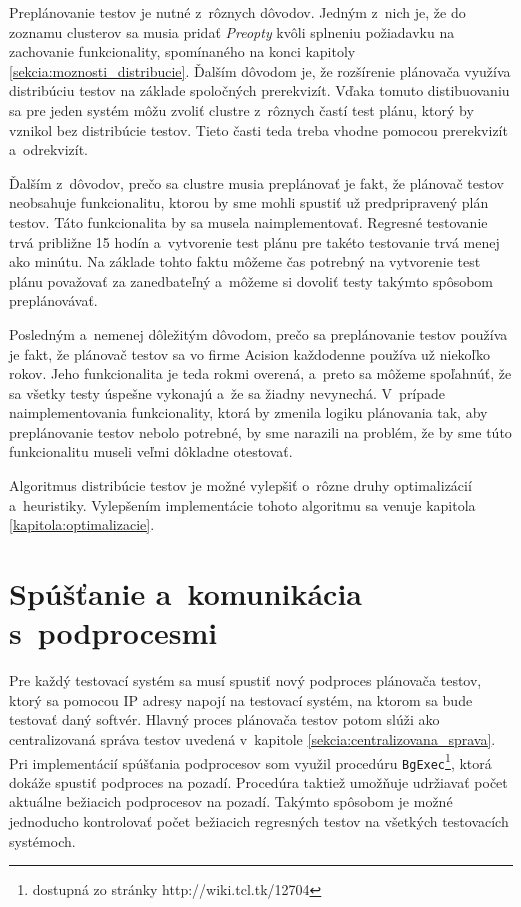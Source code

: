 Preplánovanie testov je nutné z~rôznych dôvodov. Jedným z~nich je, 
že do zoznamu clusterov sa musia pridať \textit{Preopty} kvôli splneniu 
požiadavku na zachovanie funkcionality, spomínaného na konci kapitoly 
\ref{sekcia:moznosti_distribucie}. 
Ďalším dôvodom je, že rozšírenie plánovača využíva distribúciu testov 
na základe spoločných prerekvizít. 
Vďaka tomuto distibuovaniu sa pre jeden systém môžu zvoliť clustre 
z~rôznych častí test plánu, ktorý by vznikol bez distribúcie testov.
Tieto časti teda treba vhodne  pomocou prerekvizít 
a~odrekvizít. 

Ďalším z~dôvodov, prečo sa clustre musia preplánovať je fakt, že 
plánovač testov neobsahuje funkcionalitu, ktorou by sme mohli spustiť 
už predpripravený plán testov. Táto funkcionalita by sa musela 
naimplementovať. Regresné testovanie trvá približne 15 hodín 
a~vytvorenie test plánu pre takéto testovanie trvá menej ako minútu.
Na základe tohto faktu môžeme čas potrebný na vytvorenie test plánu 
považovať za zanedbateľný a~môžeme si dovoliť testy takýmto spôsobom 
preplánovávať.

Posledným a~nemenej dôležitým dôvodom, prečo sa preplánovanie testov 
používa je fakt, že plánovač testov sa vo firme Acision každodenne 
používa už niekoľko rokov.
Jeho funkcionalita je teda rokmi overená, a~preto sa môžeme spoľahnúť, 
že sa všetky testy úspešne vykonajú a~že sa žiadny nevynechá.
V~prípade naimplementovania funkcionality, ktorá by zmenila logiku 
plánovania tak, aby preplánovanie testov nebolo potrebné, by sme narazili 
na problém, že by sme túto funkcionalitu museli veľmi dôkladne otestovať. 

Algoritmus distribúcie testov je možné vylepšiť o~rôzne druhy 
optimalizácií a~heuristiky. Vylepšením implementácie tohoto algoritmu 
sa venuje kapitola \ref{kapitola:optimalizacie}. 


\section{Spúšťanie a~komunikácia s~podprocesmi}
\label{sekcia:spustanie_podprocesov}
Pre každý testovací systém sa musí spustiť nový podproces plánovača 
testov, ktorý sa pomocou IP adresy napojí na testovací systém, 
na ktorom sa bude testovať daný softvér. Hlavný proces plánovača testov 
potom slúži ako centralizovaná správa testov uvedená
v~kapitole \ref{sekcia:centralizovana_sprava}.
Pri implementácií spúšťania podprocesov som využil procedúru 
\texttt{BgExec}\footnote{dostupná zo stránky http://wiki.tcl.tk/12704},
ktorá dokáže spustiť podproces na pozadí. Procedúra taktiež umožňuje 
udržiavať počet aktuálne bežiacich podprocesov na pozadí.
Takýmto spôsobom je možné jednoducho kontrolovať počet bežiacich 
regresných testov na všetkých testovacích systémoch.


